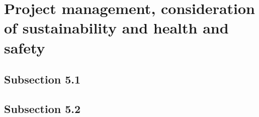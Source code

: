\section{Project management, consideration of sustainability and health and safety}
\subsection{Subsection 5.1}
\subsection{Subsection 5.2}

\label{sec:conclusion}

